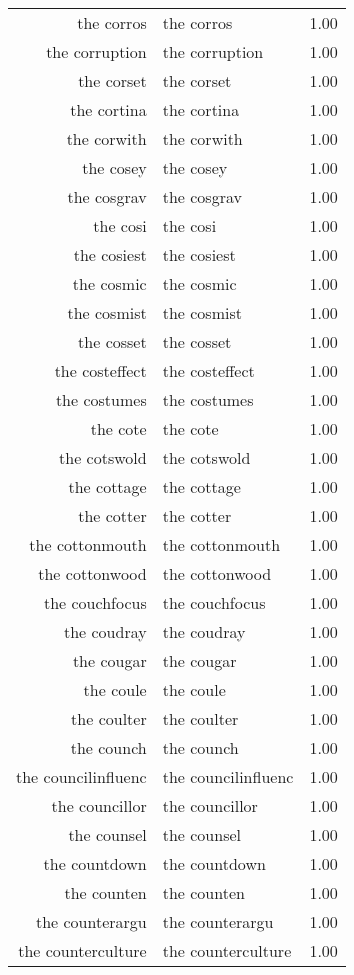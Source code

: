 \begin{table}[ht]
\begin{tabular}{rlr}
  the corros & the corros & 1.00 \\ 
  the corruption & the corruption & 1.00 \\ 
  the corset & the corset & 1.00 \\ 
  the cortina & the cortina & 1.00 \\ 
  the corwith & the corwith & 1.00 \\ 
  the cosey & the cosey & 1.00 \\ 
  the cosgrav & the cosgrav & 1.00 \\ 
  the cosi & the cosi & 1.00 \\ 
  the cosiest & the cosiest & 1.00 \\ 
  the cosmic & the cosmic & 1.00 \\ 
  the cosmist & the cosmist & 1.00 \\ 
  the cosset & the cosset & 1.00 \\ 
  the costeffect & the costeffect & 1.00 \\ 
  the costumes & the costumes & 1.00 \\ 
  the cote & the cote & 1.00 \\ 
  the cotswold & the cotswold & 1.00 \\ 
  the cottage & the cottage & 1.00 \\ 
  the cotter & the cotter & 1.00 \\ 
  the cottonmouth & the cottonmouth & 1.00 \\ 
  the cottonwood & the cottonwood & 1.00 \\ 
  the couchfocus & the couchfocus & 1.00 \\ 
  the coudray & the coudray & 1.00 \\ 
  the cougar & the cougar & 1.00 \\ 
  the coule & the coule & 1.00 \\ 
  the coulter & the coulter & 1.00 \\ 
  the counch & the counch & 1.00 \\ 
  the councilinfluenc & the councilinfluenc & 1.00 \\ 
  the councillor & the councillor & 1.00 \\ 
  the counsel & the counsel & 1.00 \\ 
  the countdown & the countdown & 1.00 \\ 
  the counten & the counten & 1.00 \\ 
  the counterargu & the counterargu & 1.00 \\ 
  the counterculture & the counterculture & 1.00 \\ 

\end{tabular}
\end{table}
